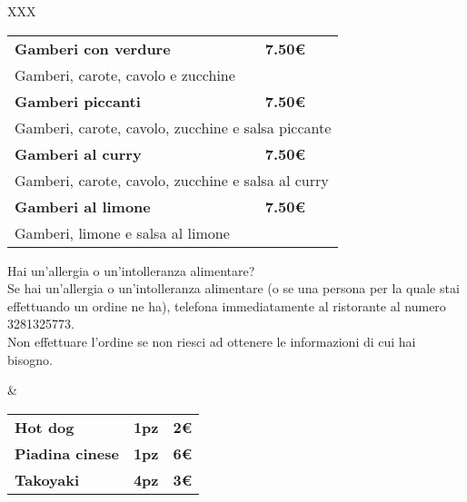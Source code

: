 \documentclass[hidelinks,10pt,a4paper]{article}
\newcommand{\mybox}[1]{
		\colorbox{square}{
		\begin{minipage}{0.97\linewidth}
			#1
		\end{minipage}
	}
}
\newcommand{\entryThreeSimple}[3]{
	{\textbf{\small{#1}}}&{\textbf{\small{#2}}}&{\textbf{\small{#3}}}\\
}
\newcommand{\entryTwoDesc}[3]{
	{\vspace*{-0.5mm}\textbf{\small{#1}}}&{\vspace*{-0.5mm}\textbf{\small{#3}}}\\
	\multicolumn{2}{l}{\textcolor{desc}{\footnotesize{#2}}}\\
}
\begin{document}
\begin{landscape}
\begin{tabularx}{\linewidth}{XXX}
{			\mybox{
				\begin{tabular*}{\linewidth}{ l l }
					\entryTwoDesc{Gamberi con verdure}{\vspace*{-0.5mm}Gamberi, carote, cavolo e zucchine}{\hspace*{15mm}7.50€}
					\entryTwoDesc{Gamberi piccanti  \hspace*{20mm}{\Large\chili}}{\vspace*{-0.5mm}Gamberi, carote, cavolo, zucchine e salsa piccante}{\hspace*{15mm}7.50€}
					\entryTwoDesc{Gamberi al curry}{\vspace*{-0.5mm}Gamberi, carote, cavolo, zucchine e salsa al curry}{\hspace*{15mm}7.50€}
					\entryTwoDesc{Gamberi al limone}{\vspace*{-0.5mm}Gamberi, limone e salsa al limone}{\hspace*{15mm}7.50€}
				\end{tabular*}
			}
	
				\vspace*{1mm}
				\colorbox{alert}{
				\begin{minipage}{0.97\linewidth}
					\raggedright {\huge\exclamationPoint} Hai un'allergia o un'intolleranza alimentare?\\ 
					Se hai un'allergia o un'intolleranza alimentare (o se una persona per la quale stai effettuando un ordine ne ha), telefona immediatamente al ristorante al numero 3281325773.\\ 
					Non effettuare l'ordine se non riesci ad ottenere le informazioni di cui hai bisogno.\\
					\vspace*{-0.5mm}
				\end{minipage}
			}
			
		}&{
				\vspace*{0.1cm}			
				\mybox{
				\begin{tabular*}{\linewidth}{ l l l }
				\entryThreeSimple{Hot dog}{\hspace*{30mm}1pz}{\hspace*{13mm}2€}
				\entryThreeSimple{Piadina cinese}{\hspace*{30mm}1pz}{\hspace*{13mm}6€}
				\entryThreeSimple{Takoyaki}{\hspace*{30mm}4pz}{\hspace*{13mm}3€}
				\end{tabular*}
			}
			
}
\end{tabularx}
\end{landscape}
\end{document}
